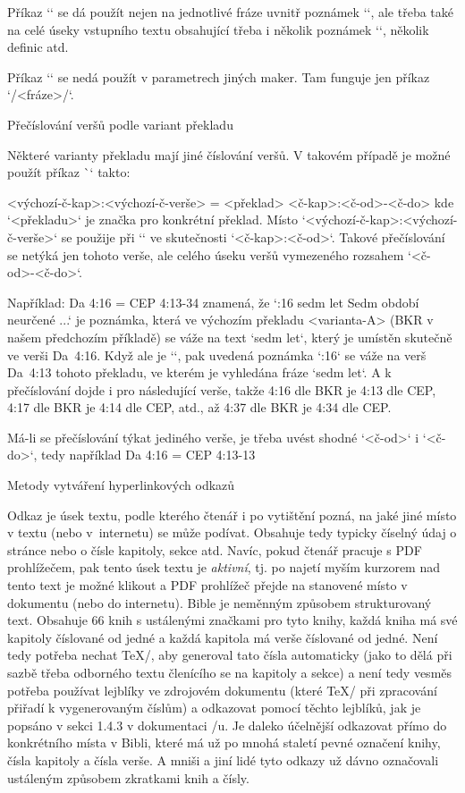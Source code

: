 Příkaz `\switch` se dá použít nejen na jednotlivé fráze uvnitř poznámek
`\Note`, ale třeba také na celé úseky vstupního textu obsahující třeba i
několik poznámek `\Note`, několik definic atd.

Příkaz `\switch` se nedá použít v parametrech jiných maker. Tam funguje jen
příkaz `\x/<fráze>/`.

\secc Přečíslování veršů podle variant překladu

Některé varianty překladu mají jiné číslování veršů. V takovém případě je
možné použít příkaz \`\renum` takto:

\begtt
{} <výchozí-č-kap>:<výchozí-č-verše> = <překlad> <č-kap>:<č-od>-<č-do>
\endtt
kde `<překladu>` je značka pro konkrétní překlad.
Místo `<výchozí-č-kap>:<výchozí-č-verše>` se použije při `\def\tmark{<překlad>}`
ve skutečnosti `<č-kap>:<č-od>`.
Takové přečíslování se netýká jen
tohoto verše, ale celého úseku veršů vymezeného rozsahem `<č-od>-<č-do>`.

Například:
\begtt
\renum Da 4:16 = CEP 4:13-34
\endtt
znamená, že `:16 {sedm let} Sedm období neurčené ...` je poznámka,
která ve výchozím překladu <varianta-A> (BKR v našem předchozím příkladě)
se váže na text `sedm let`, který je umístěn skutečně ve verši Da~4:16.
Když ale je `\def\tmark{CEP}`, pak uvedená poznámka `:16`
se váže na verš Da~4:13 tohoto překladu, ve kterém je vyhledána fráze
`sedm let`. A k přečíslování dojde i pro následující verše, takže
4:16 dle BKR je 4:13 dle CEP, 4:17 dle BKR je 4:14 dle CEP, atd., až
4:37 dle BKR je 4:34 dle CEP.

Má-li se přečíslování týkat jediného verše, je třeba uvést shodné
`<č-od>` i `<č-do>`, tedy například
\begtt
\renum Da 4:16 = CEP 4:13-13
\endtt

\sec[odkazy] Metody vytváření hyperlinkových odkazů

Odkaz je úsek textu, podle kterého čtenář i po vytištění pozná, na jaké jiné místo
v textu (nebo v~internetu) se může podívat. Obsahuje tedy typicky číselný údaj o
stránce nebo o čísle kapitoly, sekce atd. Navíc, pokud čtenář pracuje s PDF
prohlížečem, pak tento úsek textu je {\em aktivní}, tj. po najetí myším
kurzorem nad tento text je možné klikout a PDF prohlížeč přejde na stanovené
místo v dokumentu (nebo do internetu). Bible je neměnným způsobem
strukturovaný text. Obsahuje 66 knih s ustálenými značkami pro tyto knihy,
každá kniha má své kapitoly číslované od jedné a každá kapitola má verše
číslované od jedné. Není tedy potřeba nechat \TeX/, aby generoval tato čísla
automaticky (jako to dělá při sazbě třeba odborného textu členícího se na
kapitoly a sekce) a není tedy vesměs potřeba používat lejblíky ve zdrojovém
dokumentu (které \TeX/ při zpracování přiřadí k vygenerovaným číslům) a odkazovat pomocí
těchto lejblíků, jak je popsáno v sekci 1.4.3 v dokumentaci \OpTeX/u. Je
daleko účelnější odkazovat přímo do konkrétního místa v Bibli, které má už
po mnohá staletí pevné označení knihy, čísla kapitoly a čísla verše.
A mniši a jiní lidé tyto odkazy už dávno označovali ustáleným
způsobem zkratkami knih a čísly.

